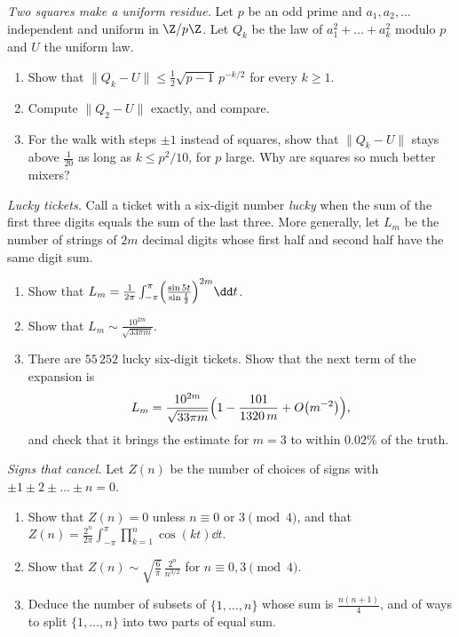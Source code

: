 \begin{exercise}[$\star$]\label{pb:squaresmodp}
\emph{Two squares make a uniform residue.} Let $p$ be an odd prime and $a_1,a_2,\dots$ independent and uniform in $\Z/p\Z$. Let $Q_k$ be the law of
$a_1^2+\dots+a_k^2$ modulo $p$ and $U$ the uniform law.
\begin{enumerate}[label=(\alph*)]
\item Show that $\|Q_k-U\|\le\frac12\sqrt{p-1}\,p^{-k/2}$ for every $k\ge1$.
\item Compute $\|Q_2-U\|$ exactly, and compare.
\item For the walk with steps $\pm1$ instead of squares, show that $\|Q_k-U\|$ stays above $\frac1{20}$ as long as $k\le p^2/10$, for $p$ large. Why are squares so
much better mixers?
\end{enumerate}
\end{exercise}

\begin{exercise}[$\star\star$]\label{pb:lucky}
\emph{Lucky tickets.} Call a ticket with a six-digit number \emph{lucky} when the sum of the first three digits
equals the sum of the last three. More generally, let $L_m$ be the number of strings of $2m$ decimal digits whose first half and second half have the same digit sum.
\begin{enumerate}[label=(\alph*)]
\item Show that $L_m=\frac1{2\pi}\int_{-\pi}^\pi\Bigl(\frac{\sin5t}{\sin\frac t2}\Bigr)^{2m}\dd t$.
\item Show that $L_m\sim\frac{10^{2m}}{\sqrt{33\pi m}}$.
\item There are $55\,252$ lucky six-digit tickets. Show that the next term of the expansion is
\[
L_m=\frac{10^{2m}}{\sqrt{33\pi m}}\Bigl(1-\frac{101}{1320\,m}+O\bigl(m^{-2}\bigr)\Bigr),
\]
and check that it brings the estimate for $m=3$ to within $0.02\%$ of the truth.
\end{enumerate}
\end{exercise}

\begin{exercise}[$\star\star\star$]\label{pb:signedsums}
\emph{Signs that cancel.} Let $Z(n)$ be the number of choices of signs with $\pm1\pm2\pm\dots\pm n=0$.
\begin{enumerate}[label=(\alph*)]
\item Show that $Z(n)=0$ unless $n\equiv0$ or $3\pmod4$, and that $Z(n)=\frac{2^n}{2\pi}\int_{-\pi}^\pi\prod_{k=1}^n\cos(kt)\dd t$.
\item Show that $Z(n)\sim\sqrt{\frac6\pi}\,\frac{2^n}{n^{3/2}}$ for $n\equiv0,3\pmod4$.
\item Deduce the number of subsets of $\{1,\dots,n\}$ whose sum is $\frac{n(n+1)}4$, and of ways to split $\{1,\dots,n\}$ into two parts of equal sum.
\end{enumerate}
\end{exercise}

